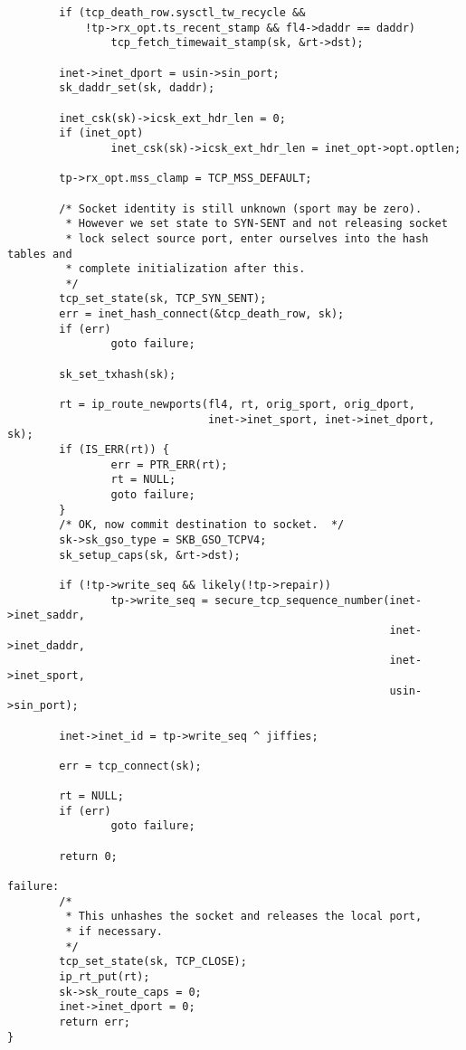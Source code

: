 \begin{verbatim}
        if (tcp_death_row.sysctl_tw_recycle &&
            !tp->rx_opt.ts_recent_stamp && fl4->daddr == daddr)
                tcp_fetch_timewait_stamp(sk, &rt->dst);

        inet->inet_dport = usin->sin_port;
        sk_daddr_set(sk, daddr);

        inet_csk(sk)->icsk_ext_hdr_len = 0;
        if (inet_opt)
                inet_csk(sk)->icsk_ext_hdr_len = inet_opt->opt.optlen;

        tp->rx_opt.mss_clamp = TCP_MSS_DEFAULT;

        /* Socket identity is still unknown (sport may be zero).
         * However we set state to SYN-SENT and not releasing socket
         * lock select source port, enter ourselves into the hash tables and
         * complete initialization after this.
         */
        tcp_set_state(sk, TCP_SYN_SENT);
        err = inet_hash_connect(&tcp_death_row, sk);
        if (err)
                goto failure;

        sk_set_txhash(sk);

        rt = ip_route_newports(fl4, rt, orig_sport, orig_dport,
                               inet->inet_sport, inet->inet_dport, sk);
        if (IS_ERR(rt)) {
                err = PTR_ERR(rt);
                rt = NULL;
                goto failure;
        }
        /* OK, now commit destination to socket.  */
        sk->sk_gso_type = SKB_GSO_TCPV4;
        sk_setup_caps(sk, &rt->dst);

        if (!tp->write_seq && likely(!tp->repair))
                tp->write_seq = secure_tcp_sequence_number(inet->inet_saddr,
                                                           inet->inet_daddr,
                                                           inet->inet_sport,
                                                           usin->sin_port);

        inet->inet_id = tp->write_seq ^ jiffies;

        err = tcp_connect(sk);

        rt = NULL;
        if (err)
                goto failure;

        return 0;

failure:
        /*
         * This unhashes the socket and releases the local port,
         * if necessary.
         */
        tcp_set_state(sk, TCP_CLOSE);
        ip_rt_put(rt);
        sk->sk_route_caps = 0;
        inet->inet_dport = 0;
        return err;
}
\end{verbatim}

